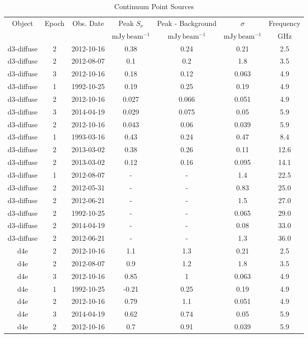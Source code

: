 \begin{table*}[htp]
\caption{Continuum Point Sources}
\begin{tabular}{ccccccc}
\label{tab:contsrcs_full}
Object & Epoch & Obs. Date & Peak $S_{\nu}$ & Peak - Background & $\sigma$ & Frequency \\
 &  &  & $\mathrm{mJy\,beam^{-1}}$ & $\mathrm{mJy\,beam^{-1}}$ & $\mathrm{mJy\,beam^{-1}}$ & $\mathrm{GHz}$ \\
\hline
d3-diffuse & 2 & 2012-10-16 & 0.38 & 0.24 & 0.21 & 2.5 \\
d3-diffuse & 2 & 2012-08-07 & 0.1 & 0.2 & 1.8 & 3.5 \\
d3-diffuse & 3 & 2012-10-16 & 0.18 & 0.12 & 0.063 & 4.9 \\
d3-diffuse & 1 & 1992-10-25 & 0.19 & 0.25 & 0.19 & 4.9 \\
d3-diffuse & 2 & 2012-10-16 & 0.027 & 0.066 & 0.051 & 4.9 \\
d3-diffuse & 3 & 2014-04-19 & 0.029 & 0.075 & 0.05 & 5.9 \\
d3-diffuse & 2 & 2012-10-16 & 0.043 & 0.06 & 0.039 & 5.9 \\
d3-diffuse & 1 & 1993-03-16 & 0.43 & 0.24 & 0.47 & 8.4 \\
d3-diffuse & 2 & 2013-03-02 & 0.38 & 0.26 & 0.11 & 12.6 \\
d3-diffuse & 2 & 2013-03-02 & 0.12 & 0.16 & 0.095 & 14.1 \\
d3-diffuse & 1 & 2012-08-07 & - & - & 1.4 & 22.5 \\
d3-diffuse & 2 & 2012-05-31 & - & - & 0.83 & 25.0 \\
d3-diffuse & 2 & 2012-06-21 & - & - & 1.5 & 27.0 \\
d3-diffuse & 2 & 1992-10-25 & - & - & 0.065 & 29.0 \\
d3-diffuse & 2 & 2014-04-19 & - & - & 0.08 & 33.0 \\
d3-diffuse & 2 & 2012-06-21 & - & - & 1.3 & 36.0 \\
d4e & 2 & 2012-10-16 & 1.1 & 1.3 & 0.21 & 2.5 \\
d4e & 2 & 2012-08-07 & 0.9 & 1.2 & 1.8 & 3.5 \\
d4e & 3 & 2012-10-16 & 0.85 & 1 & 0.063 & 4.9 \\
d4e & 1 & 1992-10-25 & -0.21 & 0.25 & 0.19 & 4.9 \\
d4e & 2 & 2012-10-16 & 0.79 & 1.1 & 0.051 & 4.9 \\
d4e & 3 & 2014-04-19 & 0.62 & 0.74 & 0.05 & 5.9 \\
d4e & 2 & 2012-10-16 & 0.7 & 0.91 & 0.039 & 5.9 \\

\end{tabular}
\end{table*}
